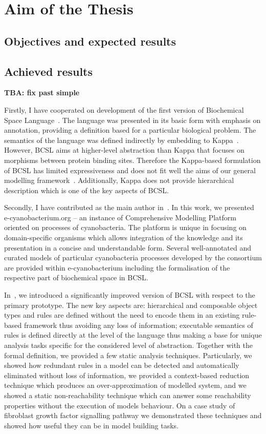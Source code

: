 \documentclass[11pt,a4paper]{report}
\begin{document}
\chapter{Aim of the Thesis} \label{chap:aim}

\section{Objectives and expected results}

\section{Achieved results}

\textbf{TBA: fix past simple}

Firstly, I have cooperated on development of the first version of Biochemical Space Language~\cite{Ded201627}. The language was presented in its basic form with emphasis on annotation, providing a definition based for a particular biological problem. The semantics of the language was defined indirectly by embedding to Kappa~\cite{kappa_formal}. However, BCSL aims at higher-level abstraction than Kappa that focuses on morphisms between protein binding sites. Therefore the Kappa-based formulation of BCSL has limited expressiveness and does not fit well the aims of our general modelling framework~\cite{cs2bio2013}. Additionally, Kappa does not provide hierarchical description which is one of the key aspects of BCSL.

Secondly, I have contributed as the main author in~\cite{Trojak2016}. In this work, we presented e-cyanobacterium.org -- an instance of Comprehensive Modelling Platform oriented on processes of cyanobacteria. The platform is unique in focusing on domain-specific organisms which allows integration of the knowledge and its presentation in a concise and understandable form. Several well-annotated and curated models of particular cyanobacteria processes developed by the consortium are provided within e-cyanobacterium including the formalisation of the respective part of biochemical space in BCSL.

In~\cite{trojak2018sasb}, we introduced a significantly improved version of BCSL with respect to the primary prototype. The new key aspects are: hierarchical and composable object types and rules are defined without the need to encode them in an existing rule-based framework thus avoiding any loss of information; executable semantics of rules is defined directly at the level of the language thus making a base for unique analysis tasks specific for the considered level of abstraction. Together with the formal definition, we provided a few static analysis techniques. Particularly, we showed how redundant rules in a model can be detected and automatically eliminated without loss of information, we provided a context-based reduction technique which produces an over-approximation of modelled system, and we showed a static non-reachability technique which can answer some reachability properties without the execution of models behaviour. On a case study of fibroblast growth factor signalling pathway we demonstrated these techniques and showed how useful they can be in model building tasks.
\end{document}

